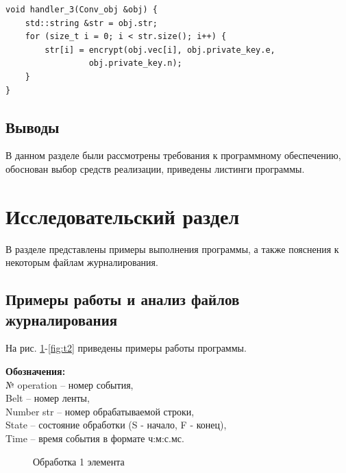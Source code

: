 \documentclass[a4paper,12pt]{article}
\begin{document}
\begin{lstlisting}[label=lst8,caption=Обработчик 3 ленты. Расшифровка строки.]
void handler_3(Conv_obj &obj) {
    std::string &str = obj.str;
    for (size_t i = 0; i < str.size(); i++) {
        str[i] = encrypt(obj.vec[i], obj.private_key.e,
    			 obj.private_key.n);
    }
}
\end{lstlisting}

\subsection*{Выводы}

В данном разделе были рассмотрены требования к 
программному обеспечению, обоснован выбор средств 
реализации, приведены листинги программы.
\newpage


\section{Исследовательский раздел}

В разделе представлены примеры выполнения программы,
а также пояснения к некоторым файлам журналирования.

\subsection{Примеры работы и анализ файлов журналирования}
        
На рис. \ref{fig:t0}-\ref{fig:t2} приведены примеры работы программы.
\begin{flushleft}
\textbf{Обозначения:}\\
№ operation -- номер события,\\
Belt -- номер ленты,\\
Number str -- номер обрабатываемой строки,\\
State -- состояние обработки (S - начало, F - конец),\\
Time -- время события в формате ч:м:с.мс.
\end{flushleft}
        
\begin{figure}[h!]
\caption{
Обработка 1 элемента}
\label{fig:t0}
\end{figure}
\end{document}
